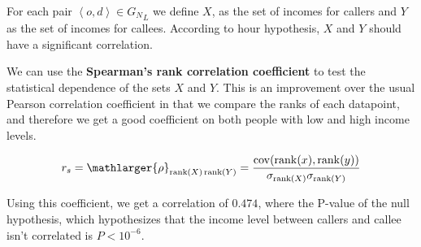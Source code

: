 For each pair \( \left< o, d \right> \in {G_N}_L \) we define \( X \), as the set of incomes for callers and \( Y \) as the set of incomes for callees. According to hour hypothesis, \( X \) and \( Y \) should have a significant correlation.

We can use the \textbf{Spearman's rank correlation coefficient} to test the statistical dependence of the sets \( X \) and \( Y \). This is an improvement over the usual Pearson correlation coefficient in that we compare the ranks of each datapoint, and therefore we get a good coefficient on both people with low and high income levels.

\[
r_s = \mathlarger{\rho}_{\operatorname{rank}(X) \operatorname{rank}(Y)} = \frac{\operatorname{cov}(\operatorname{rank}(x), \operatorname{rank}(y))}{\sigma_{\operatorname{rank}(X)} \sigma_{\operatorname{rank}(Y)}}
\]

Using this coefficient, we get a correlation of \( \num{0.474} \), where the P-value of the null hypothesis, which hypothesizes that the income level between callers and callee isn't correlated is \( P < 10^{-6} \).